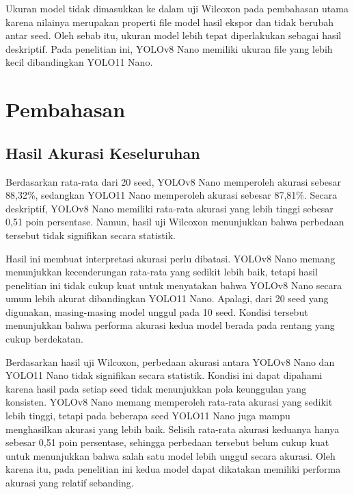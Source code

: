 \begin{sectioncontent}
\begin{subsectioncontent}
        Ukuran model tidak dimasukkan ke dalam uji Wilcoxon pada pembahasan utama karena nilainya merupakan properti file model hasil ekspor dan tidak berubah antar seed. Oleh sebab itu, ukuran model lebih tepat diperlakukan sebagai hasil deskriptif. Pada penelitian ini, YOLOv8 Nano memiliki ukuran file yang lebih kecil dibandingkan YOLO11 Nano.
    \end{subsectioncontent}
\end{sectioncontent}

\section{Pembahasan}
\begin{sectioncontent}
    \subsection{Hasil Akurasi Keseluruhan}
    \begin{subsectioncontent}
        \hspace{\parindent}Berdasarkan rata-rata dari 20 seed, YOLOv8 Nano memperoleh akurasi sebesar 88,32\%, sedangkan YOLO11 Nano memperoleh akurasi sebesar 87,81\%. Secara deskriptif, YOLOv8 Nano memiliki rata-rata akurasi yang lebih tinggi sebesar 0,51 poin persentase. Namun, hasil uji Wilcoxon menunjukkan bahwa perbedaan tersebut tidak signifikan secara statistik.

        Hasil ini membuat interpretasi akurasi perlu dibatasi. YOLOv8 Nano memang menunjukkan kecenderungan rata-rata yang sedikit lebih baik, tetapi hasil penelitian ini tidak cukup kuat untuk menyatakan bahwa YOLOv8 Nano secara umum lebih akurat dibandingkan YOLO11 Nano. Apalagi, dari 20 seed yang digunakan, masing-masing model unggul pada 10 seed. Kondisi tersebut menunjukkan bahwa performa akurasi kedua model berada pada rentang yang cukup berdekatan.

        Berdasarkan hasil uji Wilcoxon, perbedaan akurasi antara YOLOv8 Nano dan YOLO11 Nano tidak signifikan secara statistik. Kondisi ini dapat dipahami karena hasil pada setiap seed tidak menunjukkan pola keunggulan yang konsisten. YOLOv8 Nano memang memperoleh rata-rata akurasi yang sedikit lebih tinggi, tetapi pada beberapa seed YOLO11 Nano juga mampu menghasilkan akurasi yang lebih baik. Selisih rata-rata akurasi keduanya hanya sebesar 0,51 poin persentase, sehingga perbedaan tersebut belum cukup kuat untuk menunjukkan bahwa salah satu model lebih unggul secara akurasi. Oleh karena itu, pada penelitian ini kedua model dapat dikatakan memiliki performa akurasi yang relatif sebanding.


\end{subsectioncontent}
\end{sectioncontent}

